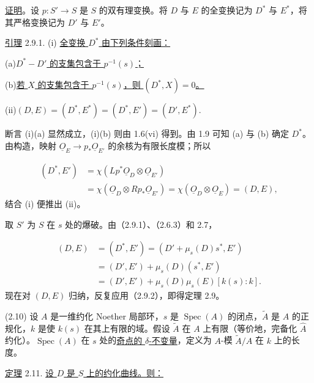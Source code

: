 \par
\underline{证明}。设 $p:S'\longrightarrow S$ 是 $S$ 的双有理变换。将 $D$ 与 $E$ 的全变换记为 $D^*$ 与 $E^*$，将其严格变换记为 $D'$ 与 $E'$。


\underline{引理} 2.9.1. (i) \underline{全变换 $D^*$ 由下列条件刻画：}

(a)\quad \underline{$D^*-D'$ 的支集包含于 $p^{-1}(s)$；}

(b)\quad \underline{若 $X$ 的支集包含于 $p^{-1}(s)$，则 $(D^*,X)=0$。}

(ii)\quad $(D,E)=(D^*,E^*)=(D^*,E')=(D',E^*)$.

断言 (i)(a) 显然成立，(i)(b) 则由 1.6(vi) 得到。由 1.9 可知 (a) 与 (b) 确定 $D^*$。由构造，映射 $\underline{O}_E\longrightarrow p_*\underline{O}_{E'}$ 的余核为有限长度模；所以

\begin{equation*}
\begin{aligned}
(D^*,E')
&=\chi(Lp^*\underline{O}_D\otimes\underline{O}_{E'})\\
&=\chi(\underline{O}_D\otimes Rp_*\underline{O}_{E'})
=\chi(\underline{O}_D\otimes\underline{O}_E)
=(D,E),
\end{aligned}
\end{equation*}
结合 (i) 便推出 (ii)。

取 $S'$ 为 $S$ 在 $s$ 处的爆破。由（2.9.1）、（2.6.3）和 2.7，

\begin{equation}\tag{2.9.2}
\begin{aligned}
(D,E)
&=(D^*,E')
=(D'+\mu_s(D)s^*,E')\\
&=(D',E')+\mu_s(D)(s^*,E')\\
&=(D',E')+\mu_s(D)\mu_s(E)[k(s):k].
\end{aligned}
\end{equation}
现在对 $(D,E)$ 归纳，反复应用（2.9.2），即得定理 2.9。

(2.10) 设 $A$ 是一维约化 Noether 局部环，$s$ 是 $\operatorname{Spec}(A)$ 的闭点，$\widetilde A$ 是 $A$ 的正规化，$k$ 是使 $k(s)$ 在其上有限的域。假设 $\widetilde A$ 在 $A$ 上有限（等价地，完备化 $\widehat A$ 约化）。$\operatorname{Spec}(A)$ 在 $s$ 处的\underline{奇点的 $\delta$-不变量}，定义为 $A$-模 $\widetilde A/A$ 在 $k$ 上的长度。


\underline{定理} 2.11. \underline{设 $D$ 是 $S$ 上的约化曲线。则：}

